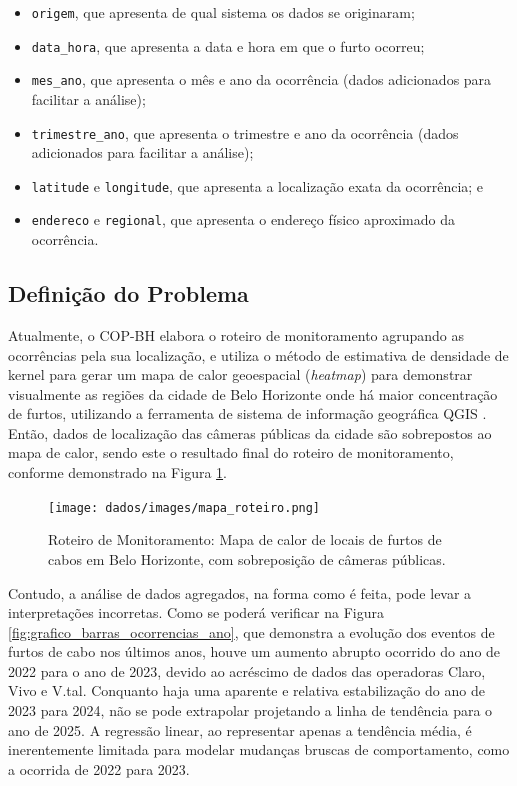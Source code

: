 \begin{itemize}
  \item{\texttt{origem}, que apresenta de qual sistema os dados se originaram;}
  \item{\texttt{data\_hora}, que apresenta a data e hora em que o furto ocorreu;}
  \item{\texttt{mes\_ano}, que apresenta o mês e ano da ocorrência (dados adicionados para facilitar a análise);}
  \item{\texttt{trimestre\_ano}, que apresenta o trimestre e ano da ocorrência (dados adicionados para facilitar a análise);}
  \item{\texttt{latitude} e \texttt{longitude}, que apresenta a localização exata da ocorrência; e}
  \item{\texttt{endereco} e \texttt{regional}, que apresenta o endereço físico aproximado da ocorrência.}
\end{itemize}

\subsection{Definição do Problema}

Atualmente, o COP-BH elabora o roteiro de monitoramento agrupando as ocorrências pela sua localização, e utiliza o método de estimativa de densidade de kernel para gerar um mapa de calor geoespacial (\textit{heatmap}) \cite{Wilkinson2009} para demonstrar visualmente as regiões da cidade de Belo Horizonte onde há maior concentração de furtos, utilizando a ferramenta de sistema de informação geográfica QGIS \cite{Qgis}. Então, dados de localização das câmeras públicas da cidade são sobrepostos ao mapa de calor, sendo este o resultado final do roteiro de monitoramento, conforme demonstrado na Figura \ref{fig:mapa_roteiro}.

\begin{figure}[!htb]
  \captionsetup{singlelinecheck=false}
  \centering
  \texttt{[image: dados/images/mapa\_roteiro.png]}
  \caption{Roteiro de Monitoramento: Mapa de calor de locais de furtos de cabos em Belo Horizonte, com sobreposição de câmeras públicas.}
  \label{fig:mapa_roteiro}
\end{figure}

Contudo, a análise de dados agregados, na forma como é feita, pode levar a interpretações incorretas. Como se poderá verificar na Figura \ref{fig:grafico_barras_ocorrencias_ano}, que demonstra a evolução dos eventos de furtos de cabo nos últimos anos, houve um aumento abrupto ocorrido do ano de 2022 para o ano de 2023, devido ao acréscimo de dados das operadoras Claro, Vivo e V.tal. Conquanto haja uma aparente e relativa estabilização do ano de 2023 para 2024, não se pode extrapolar projetando a linha de tendência para o ano de 2025. A regressão linear, ao representar apenas a tendência média, é inerentemente limitada para modelar mudanças bruscas de comportamento, como a ocorrida de 2022 para 2023.

